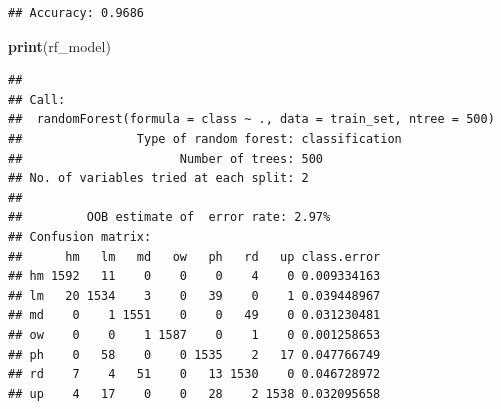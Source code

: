 \documentclass[
]{article}
\newenvironment{Shaded}{\begin{snugshade}}{\end{snugshade}}
\newcommand{\AttributeTok}[1]{\textcolor[rgb]{0.13,0.29,0.53}{#1}}
\newcommand{\CommentTok}[1]{\textcolor[rgb]{0.56,0.35,0.01}{\textit{#1}}}
\newcommand{\DecValTok}[1]{\textcolor[rgb]{0.00,0.00,0.81}{#1}}
\newcommand{\FloatTok}[1]{\textcolor[rgb]{0.00,0.00,0.81}{#1}}
\newcommand{\FunctionTok}[1]{\textcolor[rgb]{0.13,0.29,0.53}{\textbf{#1}}}
\newcommand{\NormalTok}[1]{#1}
\newcommand{\OtherTok}[1]{\textcolor[rgb]{0.56,0.35,0.01}{#1}}
\newcommand{\SpecialCharTok}[1]{\textcolor[rgb]{0.81,0.36,0.00}{\textbf{#1}}}
\newcommand{\StringTok}[1]{\textcolor[rgb]{0.31,0.60,0.02}{#1}}
\begin{document}
\begin{Shaded}
\end{Shaded}

\begin{verbatim}
## Accuracy: 0.9686
\end{verbatim}

\begin{Shaded}
\begin{Highlighting}[]
\FunctionTok{print}\NormalTok{(rf\_model)}
\end{Highlighting}
\end{Shaded}

\begin{verbatim}
## 
## Call:
##  randomForest(formula = class ~ ., data = train_set, ntree = 500) 
##                Type of random forest: classification
##                      Number of trees: 500
## No. of variables tried at each split: 2
## 
##         OOB estimate of  error rate: 2.97%
## Confusion matrix:
##      hm   lm   md   ow   ph   rd   up class.error
## hm 1592   11    0    0    0    4    0 0.009334163
## lm   20 1534    3    0   39    0    1 0.039448967
## md    0    1 1551    0    0   49    0 0.031230481
## ow    0    0    1 1587    0    1    0 0.001258653
## ph    0   58    0    0 1535    2   17 0.047766749
## rd    7    4   51    0   13 1530    0 0.046728972
## up    4   17    0    0   28    2 1538 0.032095658
\end{verbatim}
\end{document}
